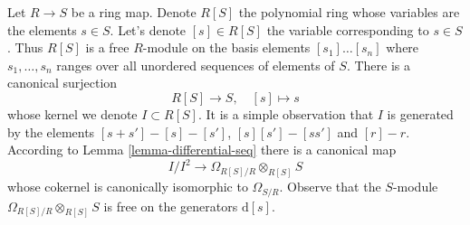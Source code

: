 \noindent
Let $R \to S$ be a ring map. Denote $R[S]$ the polynomial ring
whose variables are the elements $s \in S$. Let's denote $[s] \in R[S]$
the variable corresponding to $s \in S$. Thus $R[S]$ is a free
$R$-module on the basis elements $[s_1] \ldots [s_n]$ where
$s_1, \ldots, s_n$ ranges over all unordered sequences of elements of $S$.
There is a canonical surjection
\begin{equation}
\label{equation-canonical-presentation}
R[S] \longrightarrow S,\quad [s] \longmapsto s
\end{equation}
whose kernel we denote $I \subset R[S]$. It is a simple observation that
$I$ is generated by the elements
$[s + s'] - [s] - [s']$, $[s][s'] - [ss']$ and $[r] - r$.
According to Lemma \ref{lemma-differential-seq}
there is a canonical map
\begin{equation}
\label{equation-naive-cotangent-complex}
I/I^2 \longrightarrow \Omega_{R[S]/R} \otimes_{R[S]} S
\end{equation}
whose cokernel is canonically isomorphic to $\Omega_{S/R}$. Observe that
the $S$-module $\Omega_{R[S]/R} \otimes_{R[S]} S$ is free on the generators
$\text{d}[s]$.
